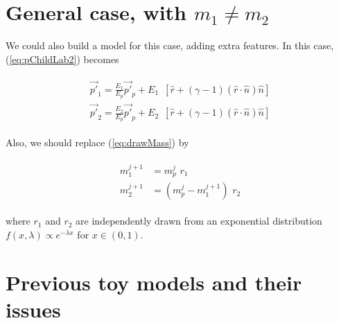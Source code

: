 \documentclass[12pt]{article}
\newcommand{\bea}{\begin{eqnarray}\begin{aligned}}
\newcommand{\eea}{\end{aligned}\end{eqnarray}}
\begin{document}
\section{General case, with  $m_1\neq m_2$}

We could also build a model for this case, adding extra features. In this case, (\ref{eq:pChildLab2}) becomes

\bea\label{eq:pChildLab2Gen}
\vec{p'}_1= \frac{E_1}{E_p} \vec{p'}_p + E_1 \,\,\,[ \hat{r} + (\gamma -1) (\hat{r} \cdot \hat{n}) \hat{n} ]  \\
\vec{p'}_2=  \frac{E_2}{E_p} \vec{p'}_p + E_2 \,\,\,[ \hat{r} + (\gamma -1) (\hat{r} \cdot \hat{n}) \hat{n} ] 
\eea

Also, we should replace (\ref{eq:drawMass}) by

\bea
m_1^{j+1} &= m_p^j\,\,  r_1  \\
m_2^{j+1} &= (m_p^j-m_1^{j+1})\,\,  r_2
\eea

where $r_1$ and $r_2$ are independently drawn from an exponential distribution $f(x,\lambda) \propto e^{-\lambda x}$ for $x \in (0,1)$.


\section{Previous toy models and their issues}




% 
% 
%
%
%
\end{document}
